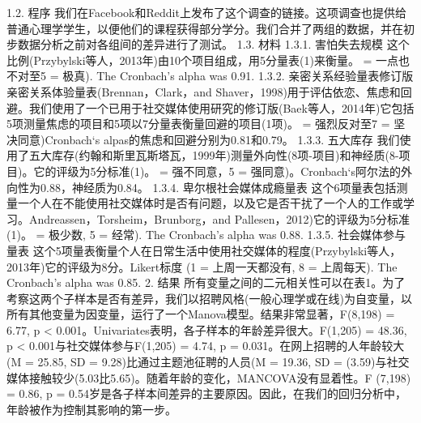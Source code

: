 1.2. 程序
我们在Facebook和Reddit上发布了这个调查的链接。这项调查也提供给普通心理学学生，以便他们的课程获得部分学分。我们合并了两组的数据，并在初步数据分析之前对各组间的差异进行了测试。
1.3. 材料
1.3.1. 害怕失去规模
这个比例(Przybylski等人，2013年)由10个项目组成，用5分量表(1)来衡量。 = 一点也不对至5 = 极真). The Cronbach's alpha was 0.91.
1.3.2. 亲密关系经验量表修订版
亲密关系体验量表(Brennan，Clark，and Shaver，1998)用于评估依恋、焦虑和回避。我们使用了一个已用于社交媒体使用研究的修订版(Baek等人，2014年)它包括5项测量焦虑的项目和5项以7分量表衡量回避的项目(1项)。 = 强烈反对至7 = 坚决同意)Cronbach‘s alpas的焦虑和回避分别为0.81和0.79。
1.3.3. 五大库存
我们使用了五大库存(约翰和斯里瓦斯塔瓦，1999年)测量外向性(8项-项目)和神经质(8-项目)。它的评级为5分标准(1)。 = 强不同意，5 = 强同意)。Cronbach‘s阿尔法的外向性为0.88，神经质为0.84。
1.3.4. 卑尔根社会媒体成瘾量表
这个6项量表包括测量一个人在不能使用社交媒体时是否有问题，以及它是否干扰了一个人的工作或学习。Andreassen，Torsheim，Brunborg，and Pallesen，2012)它的评级为5分标准(1)。 = 极少数, 5 = 经常). The Cronbach's alpha was 0.88.
1.3.5. 社会媒体参与量表
这个5项量表衡量个人在日常生活中使用社交媒体的程度(Przybylski等人，2013年)它的评级为8分。Likert标度 (1 = 上周一天都没有, 8 = 上周每天). The Cronbach's alpha was 0.85.
2. 结果
所有变量之间的二元相关性可以在表1。为了考察这两个子样本是否有差异，我们以招聘风格(一般心理学或在线)为自变量，以所有其他变量为因变量，运行了一个Manova模型。结果非常显著，F(8,198) = 6.77, p < 0.001。Univariates表明，各子样本的年龄差异很大。F(1,205) = 48.36, p < 0.001与社交媒体参与F(1,205) = 4.74, p = 0.031。在网上招聘的人年龄较大(M = 25.85, SD = 9.28)比通过主题池征聘的人员(M = 19.36, SD = (3.59)与社交媒体接触较少(5.03比5.65)。随着年龄的变化，MANCOVA没有显着性。F (7,198) = 0.86, p = 0.54岁是各子样本间差异的主要原因。因此，在我们的回归分析中，年龄被作为控制其影响的第一步。

